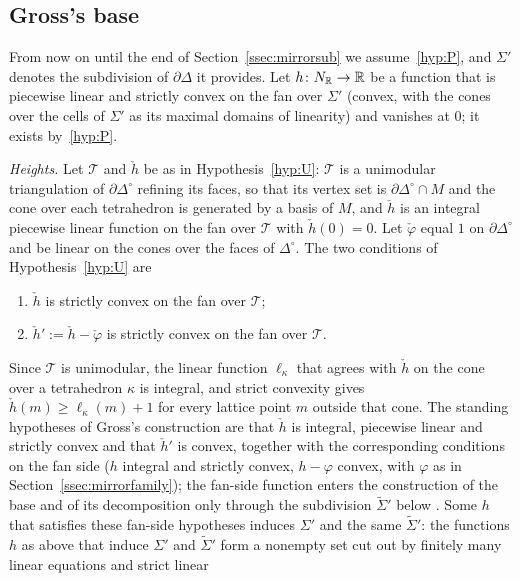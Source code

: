 \subsection{Gross's base}\label{ssec:gross}
From now on until the end of Section~\ref{ssec:mirrorsub} we assume~\ref{hyp:P}, and $\Sigma'$ denotes the subdivision
of $\partial\Delta$ it provides. Let $h\colon N_\mathbb R\to\mathbb R$ be a function that is piecewise linear and strictly convex on the
fan over $\Sigma'$ (convex, with the cones over the cells of $\Sigma'$ as its maximal domains of linearity) and vanishes at
$0$; it exists by~\ref{hyp:P}.

\emph{Heights.} Let $\mathcal T$ and $\check h$ be as in Hypothesis~\ref{hyp:U}: $\mathcal T$ is a unimodular triangulation of
$\partial\Delta^\circ$ refining its faces, so that its vertex set is $\partial\Delta^\circ\cap M$ and the cone over each
tetrahedron is generated by a basis of $M$, and $\check h$ is an integral piecewise linear function on the fan over
$\mathcal T$ with $\check h(0)=0$. Let $\check\varphi$ equal $1$ on $\partial\Delta^\circ$ and be linear on the cones over
the faces of $\Delta^\circ$. The two conditions of Hypothesis~\ref{hyp:U} are
\begin{enumerate}
\item[(G1)] $\check h$ is strictly convex on the fan over $\mathcal T$;
\item[(G2)] $\check h':=\check h-\check\varphi$ is strictly convex on the fan over $\mathcal T$.
\end{enumerate}
Since $\mathcal T$ is unimodular, the linear function $\ell_\kappa$ that agrees with $\check h$ on the cone over a tetrahedron
$\kappa$ is integral, and strict convexity gives $\check h(m)\ge\ell_\kappa(m)+1$ for every lattice point $m$ outside that
cone. The standing hypotheses of Gross's construction \cite[\S3]{Gross2005} are that $\check h$ is integral, piecewise
linear and strictly convex and that $\check h'$ is convex, together with the corresponding conditions on the fan side ($h$
integral and strictly convex, $h-\varphi$ convex, with $\varphi$ as in Section~\ref{ssec:mirrorfamily}); the fan-side function enters the construction of the base and of its
decomposition only through the subdivision $\widetilde\Sigma'$ below \cite[Prop.~3.12, Def.~3.13, Prop.~3.14]{Gross2005}.
Some $h$ that satisfies these fan-side hypotheses induces $\Sigma'$ and the same $\widetilde\Sigma'$: the functions $h$ as above
that induce $\Sigma'$ and $\widetilde\Sigma'$ form a nonempty set cut out by finitely many linear equations and strict linear
